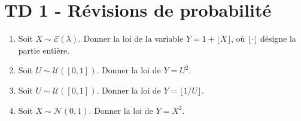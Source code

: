 \chapter*{TD 1 - Révisions de probabilité}

\setcounter{exercice}{0}

\begin{mdframed}
\begin{exercice}
\begin{enumerate}
    \item Soit $X \sim \mathcal{E}(\lambda)$. Donner la loi de la variable $Y = 1 + \lfloor X \rfloor$, où $\lfloor \cdot \rfloor$ désigne la partie entière.
    \item Soit $U \sim \mathcal{U}([0, 1])$. Donner la loi de $Y = U^2$.
    \item Soit $U \sim \mathcal{U}([0, 1])$. Donner la loi de $Y = \lfloor 1/U \rfloor$.
    \item Soit $X \sim \mathcal{N}(0, 1)$. Donner la loi de $Y = X^2$.
\end{enumerate}
\end{exercice}
\end{mdframed}

\smallskip

